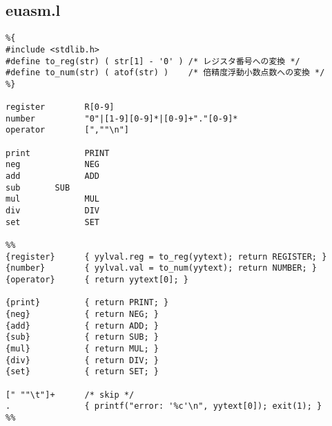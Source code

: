 \documentclass[a4j]{jsarticle}  %
\begin{document}
\subsection{euasm.l}
\begin{verbatim}
%{
#include <stdlib.h>
#define to_reg(str) ( str[1] - '0' ) /* レジスタ番号への変換 */
#define to_num(str) ( atof(str) )    /* 倍精度浮動小数点数への変換 */
%}

register        R[0-9]
number          "0"|[1-9][0-9]*|[0-9]+"."[0-9]*
operator        [",""\n"]

print           PRINT
neg             NEG
add             ADD
sub		  SUB
mul             MUL
div             DIV
set             SET

%%
{register}      { yylval.reg = to_reg(yytext); return REGISTER; }
{number}        { yylval.val = to_num(yytext); return NUMBER; }
{operator}      { return yytext[0]; }

{print}         { return PRINT; }
{neg}           { return NEG; }
{add}           { return ADD; }
{sub}           { return SUB; }
{mul}           { return MUL; }
{div}           { return DIV; }
{set}           { return SET; }

[" ""\t"]+      /* skip */
.               { printf("error: '%c'\n", yytext[0]); exit(1); }
%%
\end{verbatim}
\end{document}
